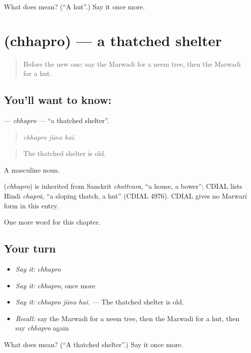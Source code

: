 \begin{tcolorbox}[breakable,colback=teal!4,colframe=teal!35!black,title={Before you move on}]
What does  mean? (\textquotedblleft{}A hut\textquotedblright{}.) Say it once more.
\end{tcolorbox}
\section[\texorpdfstring{\mw{छपरो} (chhapro)}{छपरो (chhapro)}]{ (chhapro) — a thatched shelter}

\label{lesson:MW-C188-chhapro}



\begin{quote}
Before the new one: say the Marwadi for a neem tree, then the Marwadi for a hut.
\end{quote}

\subsection*{You'll want to know: }
\textbf{} — \emph{chhapro} — \textquotedblleft{}a thatched shelter\textquotedblright{}.

\begin{quote}
  
\end{quote}

\begin{quote}
\emph{chhapro jūno hai.}
\end{quote}

\begin{quote}
The thatched shelter is old.
\end{quote}

A masculine noun.

\begin{cousinweb}
\textbf{} (\emph{chhapro}) is inherited from Sanskrit \emph{chattvara}, \textquotedblleft{}a house, a bower\textquotedblright{}; CDIAL lists Hindi \emph{chaprā}, \textquotedblleft{}a sloping thatch, a hut\textquotedblright{} (CDIAL 4976). CDIAL gives no Marwari form in this entry.
\end{cousinweb}

\begin{grammarlens}[title={What you've built}]
One more word for this chapter.
\end{grammarlens}

\subsection*{Your turn}
\begin{itemize}
\raggedright
  \item \emph{Say it:} \emph{chhapro}
  \item \emph{Say it:} \emph{chhapro}, once more
  \item \emph{Say it:} \emph{chhapro jūno hai.} — The thatched shelter is old.
  \item \emph{Recall:} say the Marwadi for a neem tree, then the Marwadi for a hut, then say \emph{chhapro} again
\end{itemize}

\begin{tcolorbox}[breakable,colback=teal!4,colframe=teal!35!black,title={Before you move on}]
What does  mean? (\textquotedblleft{}A thatched shelter\textquotedblright{}.) Say it once more.
\end{tcolorbox}
